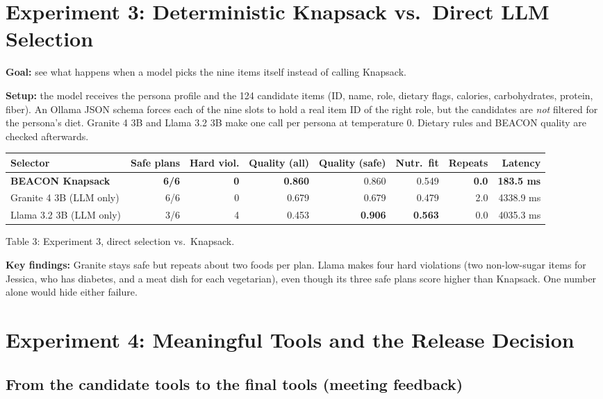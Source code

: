 \documentclass[11pt]{article}
\begin{document}
\section{Experiment 3: Deterministic Knapsack vs.\ Direct LLM Selection}

\textbf{Goal:} see what happens when a model picks the nine items itself instead
of calling Knapsack.

\textbf{Setup:} the model receives the persona profile and the 124 candidate
items (ID, name, role, dietary flags, calories, carbohydrates, protein, fiber).
An Ollama JSON schema forces each of the nine slots to hold a real item ID of
the right role, but the candidates are \emph{not} filtered for the persona's
diet. Granite 4 3B and Llama 3.2 3B make one call per persona at temperature 0.
Dietary rules and BEACON quality are checked afterwards.

\begin{center}
\footnotesize\setlength{\tabcolsep}{4pt}
\begin{tabular}{@{}lrrrrrrr@{}}
\toprule
Selector & Safe plans & Hard viol. & Quality (all) & Quality (safe) & Nutr.\ fit & Repeats & Latency \\
\midrule
\textbf{BEACON Knapsack} & \textbf{6/6} & \textbf{0} & \textbf{0.860} & 0.860 & 0.549 & \textbf{0.0} & \textbf{183.5 ms} \\
Granite 4 3B (LLM only) & 6/6 & 0 & 0.679 & 0.679 & 0.479 & 2.0 & 4338.9 ms \\
Llama 3.2 3B (LLM only) & 3/6 & 4 & 0.453 & \textbf{0.906} & \textbf{0.563} & 0.0 & 4035.3 ms \\
\bottomrule
\end{tabular}

Table 3: Experiment 3, direct selection vs.\ Knapsack.
\end{center}

\textbf{Key findings:} Granite stays safe but repeats about two foods per plan.
Llama makes four hard violations (two non-low-sugar items for Jessica, who has
diabetes, and a meat dish for each vegetarian), even though its three safe plans
score higher than Knapsack. One number alone would hide either failure.

\section{Experiment 4: Meaningful Tools and the Release Decision}

\subsection{From the candidate tools to the final tools (meeting feedback)}
\end{document}
